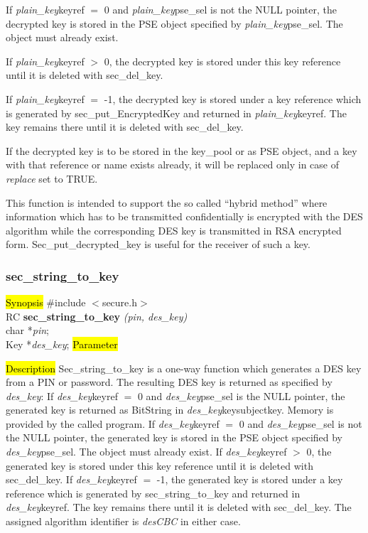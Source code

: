 If {\em plain\_key}\pf keyref $=$ 0 and {\em plain\_key}\pf pse\_sel is not the NULL pointer, the decrypted key
is stored in the PSE object specified by {\em plain\_key}\pf pse\_sel. The object must already exist. 

If {\em plain\_key}\pf keyref $>$ 0, the decrypted key is stored under this key reference until it is
deleted with sec\_del\_key. 

If {\em plain\_key}\pf keyref $=$ -1, the decrypted key is stored under a key reference which is generated 
by sec\_put\_EncryptedKey and returned in {\em plain\_key}\pf keyref. The key remains there until it is deleted
with sec\_del\_key. 

If the decrypted key is to be stored in the key\_pool or as PSE object, and a key with that
reference or name exists already, it will be replaced only in case of {\em replace} set to TRUE.

This function is intended to support the so called ``hybrid method'' where information which
has to be transmitted confidentially is encrypted with the DES algorithm while the corresponding DES key
is transmitted in RSA encrypted form. Sec\_put\_decrypted\_key is useful for the receiver
of such a key.

\subsubsection{sec\_string\_to\_key}
\label{sec_string_to_key}
\hl{Synopsis}
\#include $<$secure.h$>$ \\ [0.5cm]
RC {\bf sec\_string\_to\_key} {\em (pin, des\_key)} \\
char *{\em pin}; \\
Key *{\em des\_key};
\hl{Parameter}


\hl{Description}
Sec\_string\_to\_key is a one-way function which generates a DES key from a PIN or password.
The resulting DES key is returned as specified by {\em des\_key}:
\be
\m If {\em des\_key}\pf keyref $=$ 0 and {\em des\_key}\pf pse\_sel is the NULL pointer, the generated key is
   returned as BitString in {\em des\_key}\pf key\pf subjectkey. Memory is provided by the called program. 
\m If {\em des\_key}\pf keyref $=$ 0 and {\em des\_key}\pf pse\_sel is not the NULL pointer, the generated key
   is stored in the PSE object specified by {\em des\_key}\pf pse\_sel. The object must already exist. 
\m If {\em des\_key}\pf keyref $>$ 0, the generated key is stored under this key reference until it is
   deleted with sec\_del\_key.
\m If {\em des\_key}\pf keyref $=$ -1, the generated key is stored under a key reference which is generated 
   by sec\_string\_to\_key and returned in {\em des\_key}\pf keyref. The key remains there until it is deleted
   with sec\_del\_key.
\ee
The assigned algorithm identifier is {\em desCBC} in either case.

